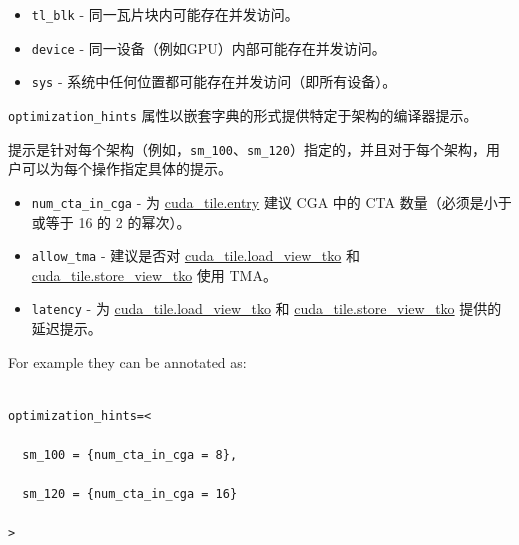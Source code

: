 \documentclass{article}
\begin{document}
\begin{itemize}
\item \texttt{tl\_blk} - 同一瓦片块内可能存在并发访问。
\item \texttt{device} - 同一设备（例如GPU）内部可能存在并发访问。
\item \texttt{sys} - 系统中任何位置都可能存在并发访问（即所有设备）。


\end{itemize}
\texttt{optimization\_hints} 属性以嵌套字典的形式提供特定于架构的编译器提示。



提示是针对每个架构（例如，\texttt{sm\_100}、\texttt{sm\_120}）指定的，并且对于每个架构，用户可以为每个操作指定具体的提示。



\begin{itemize}
\item \texttt{num\_cta\_in\_cga} - 为 \href{https://docs.nvidia.com/cuda/tile-ir/latest/sections/operations.html#op-cuda-tile-entry}{cuda\_tile.entry} 建议 CGA 中的 CTA 数量（必须是小于或等于 16 的 2 的幂次）。
\item \texttt{allow\_tma} - 建议是否对 \href{https://docs.nvidia.com/cuda/tile-ir/latest/sections/operations.html#op-cuda-tile-load-view-tko}{cuda\_tile.load\_view\_tko} 和 \href{https://docs.nvidia.com/cuda/tile-ir/latest/sections/operations.html#op-cuda-tile-store-view-tko}{cuda\_tile.store\_view\_tko} 使用 TMA。
\item \texttt{latency} - 为 \href{https://docs.nvidia.com/cuda/tile-ir/latest/sections/operations.html#op-cuda-tile-load-view-tko}{cuda\_tile.load\_view\_tko} 和 \href{https://docs.nvidia.com/cuda/tile-ir/latest/sections/operations.html#op-cuda-tile-store-view-tko}{cuda\_tile.store\_view\_tko} 提供的延迟提示。


\end{itemize}
For example they can be annotated as:




\begin{lstlisting}

optimization_hints=<

  sm_100 = {num_cta_in_cga = 8},

  sm_120 = {num_cta_in_cga = 16}

>

\end{lstlisting}
\end{document}

